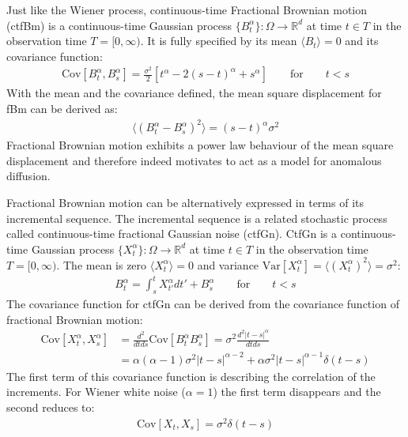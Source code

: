 \documentclass[
  a4paper,BCOR10mm,oneside,
  headsepline,footsepline,%
  fleqn,openbib
]{scrbook}
\begin{document}
Just like the Wiener process, continuous-time Fractional Brownian motion (ctfBm) is a continuous-time Gaussian process $\{B^{\alpha}_t\}: \Omega \rightarrow \mathbb{R}^d$ at time $t \in T$ in the observation time $T =[0, \infty)$. It is fully specified by its mean $\langle B_t \rangle=0$ and its covariance function:
\begin{align}
\mathrm{Cov}[B^{\alpha}_t,B^{\alpha}_s]=\frac{\sigma^2}{2}[t^{\alpha}-2(s-t)^{\alpha}+s^{\alpha}] \qquad \text{for} \qquad t<s \label{correlationfunctionfbm}
\end{align}
With the mean and the covariance defined, the mean square displacement for fBm can be derived as: 
\begin{align}
\label{MSDfbm}
 \langle (B^{\alpha}_{t}-B^{\alpha}_{s})^2 \rangle = (s-t)^\alpha \sigma^2
\end{align}
Fractional Brownian motion exhibits a power law behaviour of the mean square displacement and therefore indeed motivates to act as a model for anomalous diffusion.\par Fractional Brownian motion can be alternatively expressed in terms of its incremental sequence. The incremental sequence is a related stochastic process called continuous-time fractional Gaussian noise (ctfGn). CtfGn is a continuous-time Gaussian process $\{X^{\alpha}_t\}: \Omega \rightarrow \mathbb{R}^d$ at time $t \in T$ in the observation time $T =[0, \infty)$. The mean is zero  $\langle X^{\alpha}_t \rangle=0$   and variance $\mathrm{Var}[X^{\alpha}_t]= \langle (X^{\alpha}_t)^2 \rangle=\sigma^2$:
\begin{align}
  B^{\alpha}_t=\int^t_s X^{\alpha}_{t'} d t' +  B^{\alpha}_s \qquad \text{for} \qquad t<s
\end{align}
The covariance function for ctfGn can be derived from the covariance function of fractional Brownian motion:
\begin{align}
\mathrm{Cov}[X^{\alpha}_t,X^{\alpha}_s]&= \frac{d^2}{dt ds} \mathrm{Cov}[B^{\alpha}_t B^{\alpha}_s]=\sigma^2 \frac{d^2 |t-s|^{\alpha}}{dtds} \label{eq:covfgn} \\
 &=\alpha (\alpha-1) \sigma^2 |t-s|^{\alpha-2}+\alpha \sigma^2 |t-s|^{\alpha-1} \delta(t-s) \label{eq:covfgn1}
\end{align}
The first term of this covariance function is describing the correlation of the increments. For Wiener white noise ($\alpha=1$) the first term disappears and the second reduces to:
\begin{align}
 \mathrm{Cov}[X_t,X_s]= \sigma^2 \delta(t-s)
\end{align}
\end{document}
